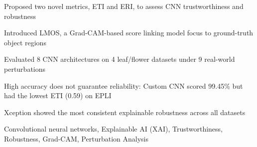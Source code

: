 \documentclass[a4paper,fleqn]{cas-dc}
\begin{document}
	\begin{highlights}
		\item Proposed two novel metrics, ETI and ERI, to assess CNN trustworthiness and robustness
\item Introduced LMOS, a Grad-CAM-based score linking model focus to ground-truth object regions
\item Evaluated 8 CNN architectures on 4 leaf/flower datasets under 9 real-world perturbations
\item High accuracy does not guarantee reliability: Custom CNN scored 99.45\% but had the lowest ETI (0.59) on EPLI
\item Xception showed the most consistent explainable robustness across all datasets
	\end{highlights}

    
	
	\begin{keywords}
		Convolutional neural networks, Explainable AI (XAI), Trustworthiness, Robustness, Grad-CAM, Perturbation Analysis
	\end{keywords}
	
	\maketitle
	\textbf{}
	
\end{document}

